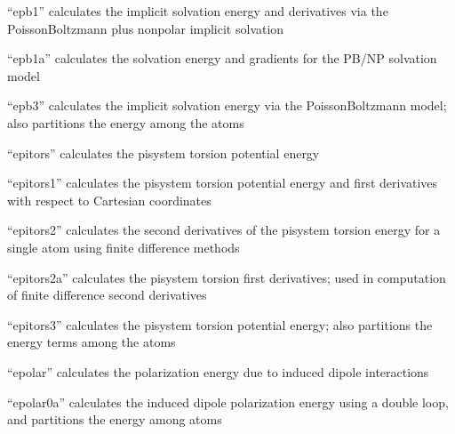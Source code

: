 \documentclass[letterpaper,11pt,english]{sphinxmanual}
\begin{document}
\sphinxAtStartPar
{}

\sphinxAtStartPar
“epb1” calculates the implicit solvation energy and derivatives via the Poisson\sphinxhyphen{}Boltzmann plus nonpolar implicit solvation

\sphinxAtStartPar
{}

\sphinxAtStartPar
“epb1a” calculates the solvation energy and gradients for the PB/NP solvation model

\sphinxAtStartPar
{}

\sphinxAtStartPar
“epb3” calculates the implicit solvation energy via the Poisson\sphinxhyphen{}Boltzmann model; also partitions the energy among the atoms

\sphinxAtStartPar
{}

\sphinxAtStartPar
“epitors” calculates the pi\sphinxhyphen{}system torsion potential energy

\sphinxAtStartPar
{}

\sphinxAtStartPar
“epitors1” calculates the pi\sphinxhyphen{}system torsion potential energy and first derivatives with respect to Cartesian coordinates

\sphinxAtStartPar
{}

\sphinxAtStartPar
“epitors2” calculates the second derivatives of the pi\sphinxhyphen{}system torsion energy for a single atom using finite difference methods

\sphinxAtStartPar
{}

\sphinxAtStartPar
“epitors2a” calculates the pi\sphinxhyphen{}system torsion first derivatives; used in computation of finite difference second derivatives

\sphinxAtStartPar
{}

\sphinxAtStartPar
“epitors3” calculates the pi\sphinxhyphen{}system torsion potential energy; also partitions the energy terms among the atoms

\sphinxAtStartPar
{}

\sphinxAtStartPar
“epolar” calculates the polarization energy due to induced dipole interactions

\sphinxAtStartPar
{}

\sphinxAtStartPar
“epolar0a” calculates the induced dipole polarization energy using a double loop, and partitions the energy among atoms
\end{document}
